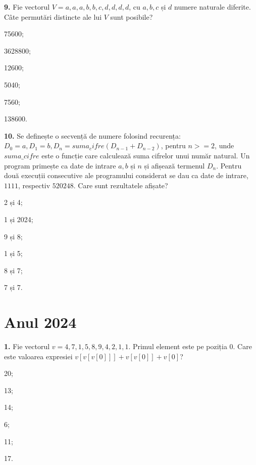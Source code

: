 \documentclass[11pt, a4paper]{article}
\begin{document}
\textbf{9.}\newline
Fie vectorul $V={a,a,a,b,b,c,d,d,d,d}$, cu $a, b, c$ și $d$ numere naturale diferite. Câte permutări distincte ale lui $V$ sunt posibile?
\begin{inparaenum}
    \item 75600;
    \item 3628800;
    \item 12600;
    \item 5040;
    \item 7560;
    \item 138600.
\end{inparaenum}

\vspace{0.5cm}

\textbf{10.}\newline
Se definește o secvență de numere folosind recurența: $D_0=a, D_1=b, D_n=suma_cifre(D_{n-1}+D_{n-2})$, pentru $n>=2$, unde $suma\_cifre$ este o funcție care calculează suma cifrelor unui număr natural. Un program primește ca date de intrare $a, b$ și $n$ și afișează termenul $D_n$. Pentru două execuții consecutive ale programului considerat se dau ca date de intrare, $1 1 11$, respectiv $5 2024 8$. Care sunt rezultatele afișate?
\begin{inparaenum}
    \item 2 și 4;
    \item 1 și 2024;
    \item 9 și 8;
    \item 1 și 5;
    \item 8 și 7;
    \item 7 și 7.
\end{inparaenum}


\section{Anul 2024}
\textbf{1.}\newline
Fie vectorul $v={4,7,1,5,8,9,4,2,1,1}$. Primul element este pe poziția 0. Care este valoarea expresiei $v[v[v[0]]] + v[v[0]] + v[0]$?
\begin{inparaenum}
    \item 20;
    \item 13;
    \item 14;
    \item 6;
    \item 11;
    \item 17.
\end{inparaenum}
\end{document}
